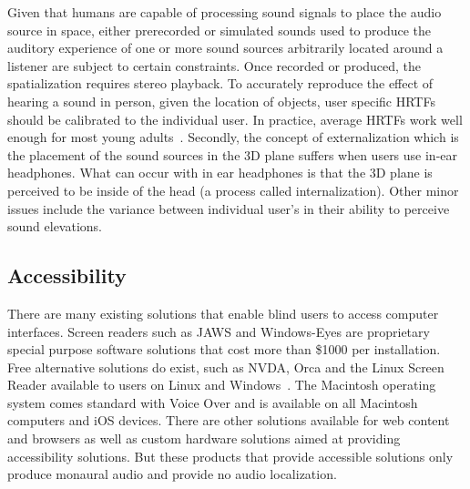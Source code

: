 Given that humans are capable of processing sound signals to place the audio
source in space, either prerecorded or simulated sounds used to produce the
auditory experience of one or more sound sources arbitrarily located around a
listener are subject to certain constraints. Once recorded or produced, the
spatialization requires stereo playback. To accurately reproduce the effect of
hearing a sound in person, given the location of objects, user specific HRTFs
should be calibrated to the individual user. In practice, average HRTFs work
well enough for most young adults~\cite{wenzel1993localization}. Secondly, the
concept of externalization which is the placement of the sound sources in the 3D
plane suffers when users use in-ear headphones.  What can occur with in ear
headphones is that the 3D plane is perceived to be inside of the head (a process
called internalization). Other minor issues include the variance between
individual user's in their ability to perceive sound elevations.


\subsection{                  Accessibility                                   }

There are many existing solutions that enable blind users to access computer
interfaces.  Screen readers such as JAWS and Windows-Eyes are proprietary special
purpose software solutions that cost more than \$1000 per installation. Free
alternative solutions do exist, such as NVDA, Orca and the Linux Screen Reader
available to users on Linux and Windows~\cite{bigham2008webanywhere}.  The
Macintosh operating system comes standard with Voice Over and is available on
all Macintosh computers and iOS devices. There are other solutions available for
web content and browsers as  well as custom hardware solutions aimed at
providing accessibility solutions. But these products that provide accessible
solutions only produce monaural audio and provide no audio localization.
